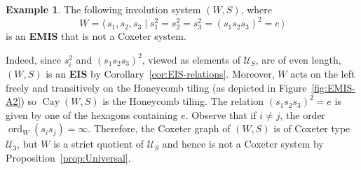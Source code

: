 \documentclass[A4paper, oneside]{amsart}
\newcommand{\id}{\textit{e}}
\newcommand{\mpair}[1]{\langle\, #1\,\rangle}  %
\newcommand{\ord}{\operatorname{ord}}
\newcommand{\Cay}{\operatorname{Cay}}
\newcommand{\U}{\mathcal{U}}
\newcommand{\EIS}{\textnormal{\bf EIS}\xspace}
\newcommand{\EMIS}{\textnormal{\bf EMIS}\xspace}
\theoremstyle{definition}
\newtheorem{ex}[thm]{Example}
\begin{document}
\begin{ex}\label{ex:EMIS-A2} The following involution system $(W,S)$, where
$$
W=\mpair{s_1,s_2,s_3\mid s_1^2=s_2^2=s_3^2=(s_1s_2s_3)^2=\id}
$$
is an \EMIS that is not a Coxeter system. 

Indeed, since $s_i^2$ and $(s_1s_2s_3)^2$, viewed as elements of $\U_S$, are of even length,  $(W,S)$ is an \EIS by Corollary~\ref{cor:EIS-relations}.  Moreover, $W$ acts on the left freely and transitively on the Honeycomb tiling (as depicted in Figure~\ref{fig:EMIS-A2}) so $\Cay(W,S)$ is the Honeycomb tiling. 
The relation $(s_1s_2s_3)^2=\id$ is given by one of the hexagons containing $\id$. Observe that if $i\not = j$, the order $\ord_W(s_is_j)=\infty$. Therefore, the Coxeter graph of $(W,S)$ is of Coxeter type $\U_3$, but $W$ is a strict quotient of $\U_S$ and hence is not a Coxeter system by Proposition~\ref{prop:Universal}. 


\begin{center}
\begin{figure}
\end{figure}
\end{center}
\end{ex}
\end{document}
